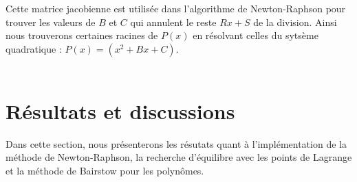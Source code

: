 \documentclass{article}
\begin{document}
Cette matrice jacobienne est utilisée dans l'algorithme de Newton-Raphson pour trouver les valeurs de $B$ et $C$ qui annulent le reste $Rx + S$ de la division. Ainsi nous trouverons certaines racines de \(P(x)\) en résolvant celles du sytsème quadratique : \(P(x) = (x^2 + Bx + C)\).\\ \\ 

\section{Résultats et discussions}
Dans cette section, nous présenterons les résutats quant à l'implémentation de la méthode de Newton-Raphson, la recherche d'équilibre avec les points de Lagrange et la méthode de Bairstow pour les polynômes.
\end{document}
